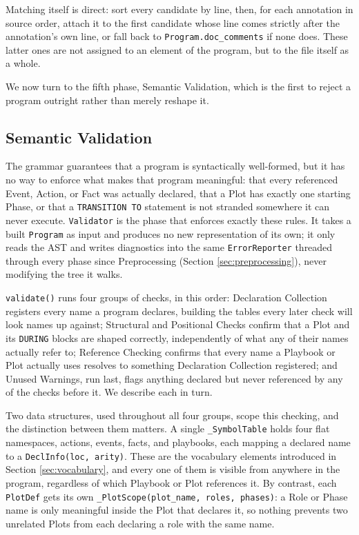Matching itself is direct: sort every candidate by line, then, for each annotation in source order, attach it to the first candidate whose line comes strictly after the annotation's own line, or fall back to \lstinline|Program.doc_comments| if none does. These latter ones are not assigned to an element of the program, but to the file itself as a whole.

We now turn to the fifth phase, Semantic Validation, which is the first to reject a program outright rather than merely reshape it.

\subsection{Semantic Validation}
\label{sec:semantic-validation}
The grammar guarantees that a program is syntactically well-formed, but it has no way to enforce what makes that program meaningful: that every referenced Event, Action, or Fact was actually declared, that a Plot has exactly one starting Phase, or that a \lstinline|TRANSITION TO| statement is not stranded somewhere it can never execute. \lstinline|Validator| is the phase that enforces exactly these rules. It takes a built \lstinline|Program| as input and produces no new representation of its own; it only reads the AST and writes diagnostics into the same \lstinline|ErrorReporter| threaded through every phase since Preprocessing (Section \ref{sec:preprocessing}), never modifying the tree it walks.

\lstinline|validate()| runs four groups of checks, in this order: Declaration Collection registers every name a program declares, building the tables every later check will look names up against; Structural and Positional Checks confirm that a Plot and its \lstinline|DURING| blocks are shaped correctly, independently of what any of their names actually refer to; Reference Checking confirms that every name a Playbook or Plot actually uses resolves to something Declaration Collection registered; and Unused Warnings, run last, flags anything declared but never referenced by any of the checks before it. We describe each in turn.

Two data structures, used throughout all four groups, scope this checking, and the distinction between them matters. A single \lstinline|_SymbolTable| holds four flat namespaces, actions, events, facts, and playbooks, each mapping a declared name to a \lstinline|DeclInfo(loc, arity)|. These are the vocabulary elements introduced in Section \ref{sec:vocabulary}, and every one of them is visible from anywhere in the program, regardless of which Playbook or Plot references it. By contrast, each \lstinline|PlotDef| gets its own \lstinline|_PlotScope(plot_name, roles, phases)|: a Role or Phase name is only meaningful inside the Plot that declares it, so nothing prevents two unrelated Plots from each declaring a role with the same name.

